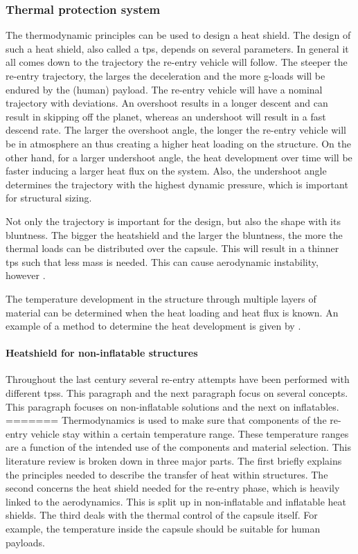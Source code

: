 \subsubsection{Thermal protection system}
The thermodynamic principles can be used to design a heat shield. The design of such a heat shield, also called a \acrfull{tps}, depends on several parameters. In general it all comes down to the trajectory the re-entry vehicle will follow. The steeper the re-entry trajectory, the larges the deceleration and the more g-loads will be endured by the (human) payload. The re-entry vehicle will have a nominal trajectory with deviations. An overshoot results in a longer descent and can result in skipping off the planet, whereas an undershoot will result in a fast descend rate. The larger the overshoot angle, the longer the re-entry vehicle will be in atmosphere an thus creating a higher heat loading on the structure. On the other hand, for a larger undershoot angle, the heat development over time will be faster inducing a larger heat flux on the system. Also, the undershoot angle determines the trajectory with the highest dynamic pressure, which is important for structural sizing. 

Not only the trajectory is important for the design, but also the shape with its bluntness. The bigger the heatshield and the larger the bluntness, the more the  thermal loads can be distributed over the capsule. This will result in a thinner \gls{tps} such that less mass is needed. This can cause aerodynamic instability, however \cite{Smoot}.

The temperature development in the structure through multiple layers of material can be determined when the heat loading and heat flux is known. An example of a method to determine the heat development is given by \cite{Daryabeigi2002}.

\paragraph{Heatshield for non-inflatable structures}
Throughout the last century several re-entry attempts have been performed with different \gls{tps}s. This paragraph and the next paragraph focus on several concepts. This paragraph focuses on non-inflatable solutions and the next on inflatables. 
=======
Thermodynamics is used to make sure that components of the re-entry vehicle stay within a certain temperature range. These temperature ranges are a function of the intended use of the components and material selection. This literature review is broken down in three major parts. The first briefly explains the principles needed to describe the transfer of heat within structures. The second concerns the heat shield needed for the re-entry phase, which is heavily linked to the aerodynamics. This is split up in non-inflatable and inflatable heat shields. The third deals with the thermal control of the capsule itself. For example, the temperature inside the capsule should be suitable for human payloads.

